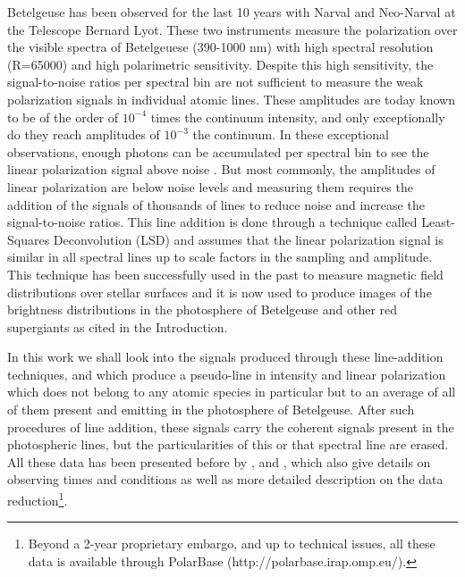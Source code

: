 \documentclass{aa}
\begin{document}
Betelgeuse has been observed for the last 10 years with Narval and Neo-Narval at the Telescope Bernard Lyot. These two instruments measure the polarization 
over the visible spectra of Betelgeuese (390-1000 nm) with high spectral resolution (R=65000) and high polarimetric sensitivity. Despite 
this high sensitivity, the signal-to-noise ratios per spectral bin are not sufficient to measure the weak polarization signals in individual 
atomic lines. These amplitudes are today known to be of the order of $10^{-4}$ times the continuum intensity, and only exceptionally do they 
reach amplitudes of $10^{-3}$ the continuum. In these exceptional observations, enough photons can be accumulated per spectral bin to 
see the linear polarization signal above noise \citep{auriere_discovery_2016}. But most commonly, the amplitudes of linear polarization are 
below noise levels and measuring them requires the addition of the signals of thousands of lines to reduce  noise and increase the 
signal-to-noise ratios. This line addition 
is done through a technique called Least-Squares Deconvolution (LSD) \citep{donati_spectropolarimetric_1997} and assumes that the 
linear polarization signal is similar 
in all spectral lines up to scale factors in the sampling and amplitude. This technique has been successfully used in the past to measure 
magnetic field distributions over stellar surfaces and it is now used to produce images of the brightness distributions in the photosphere 
of Betelgeuse and other red supergiants as cited in the Introduction. 

In this work we shall look into the signals produced through these line-addition techniques, and which produce a pseudo-line in intensity 
and linear polarization which does not belong to any atomic species in particular but to an average of all of them present and emitting in the 
photosphere of Betelgeuse. After such procedures of line addition, these signals carry the coherent signals present in the photospheric lines, but the particularities of this or 
that spectral line are erased. All these data has been presented before by \cite{auriere_discovery_2016}, \cite{mathias_evolution_2018} and 
\cite{lopez_ariste_three-dimensional_2022}, which also give details on observing times and conditions as well as more detailed description 
on the data reduction\footnote[1]{Beyond a 2-year proprietary embargo, and up to technical issues, all these data is available through 
PolarBase (http://polarbase.irap.omp.eu/).}.



\end{document}
